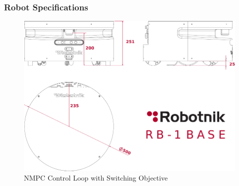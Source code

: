 	\begin{frame}
		\frametitle{Robot Specifications}
		\begin{figure}[hbtp]
			\centering
			\includegraphics[scale=0.6]{pictures/robotnik.pdf}
			\caption{NMPC Control Loop with Switching Objective}
		\end{figure}
	\end{frame}
 
